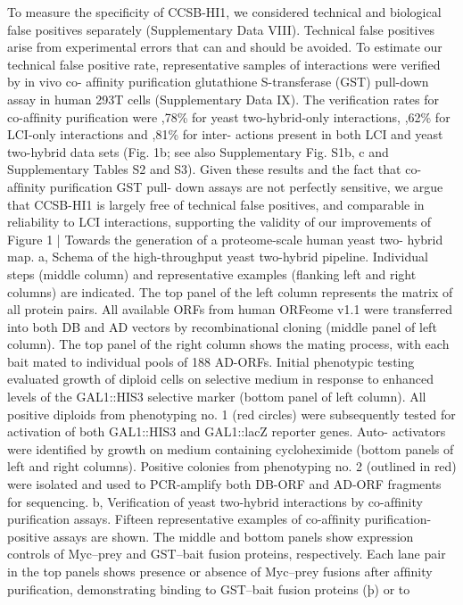 To measure the speciﬁcity of CCSB-HI1, we considered technical
and biological false positives separately (Supplementary Data VIII).
Technical false positives arise from experimental errors that can and
should be avoided. To estimate our technical false positive rate,
representative samples of interactions were veriﬁed by in vivo co-
afﬁnity puriﬁcation glutathione S-transferase (GST) pull-down assay
in human 293T cells (Supplementary Data IX). The veriﬁcation rates
for co-afﬁnity puriﬁcation were ,78\% for yeast two-hybrid-only
interactions, ,62\% for LCI-only interactions and ,81\% for inter-
actions present in both LCI and yeast two-hybrid data sets (Fig. 1b; see
also Supplementary Fig. S1b, c and Supplementary Tables S2 and S3).
Given these results and the fact that co-afﬁnity puriﬁcation GST pull-
down assays are not perfectly sensitive, we argue that CCSB-HI1 is
largely free of technical false positives, and comparable in reliability
to LCI interactions, supporting the validity of our improvements of
Figure 1 | Towards the generation of a proteome-scale human yeast two-
hybrid map. a, Schema of the high-throughput yeast two-hybrid pipeline.
Individual steps (middle column) and representative examples (ﬂanking left
and right columns) are indicated. The top panel of the left column
represents the matrix of all protein pairs. All available ORFs from human
ORFeome v1.1 were transferred into both DB and AD vectors by
recombinational cloning (middle panel of left column). The top panel of the
right column shows the mating process, with each bait mated to individual
pools of 188 AD-ORFs. Initial phenotypic testing evaluated growth of
diploid cells on selective medium in response to enhanced levels of the
GAL1::HIS3 selective marker (bottom panel of left column). All positive
diploids from phenotyping no. 1 (red circles) were subsequently tested for
activation of both GAL1::HIS3 and GAL1::lacZ reporter genes. Auto-
activators were identiﬁed by growth on medium containing cycloheximide
(bottom panels of left and right columns). Positive colonies from
phenotyping no. 2 (outlined in red) were isolated and used to PCR-amplify
both DB-ORF and AD-ORF fragments for sequencing. b, Veriﬁcation of
yeast two-hybrid interactions by co-afﬁnity puriﬁcation assays. Fifteen
representative examples of co-afﬁnity puriﬁcation-positive assays are
shown. The middle and bottom panels show expression controls of
Myc–prey and GST–bait fusion proteins, respectively. Each lane pair in the
top panels shows presence or absence of Myc–prey fusions after afﬁnity
puriﬁcation, demonstrating binding to GST–bait fusion proteins (þ) or to

